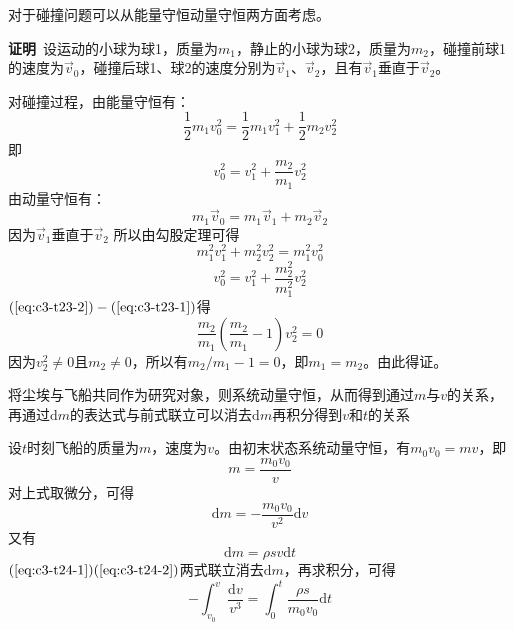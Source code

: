 \documentclass[b5paper,opensource,sourcefont,parskip]{qyxf-book}
\newcommand{\di}[1]{\mathrm{d}#1}
\begin{document}

\analysis 对于碰撞问题可以从能量守恒动量守恒两方面考虑。

\noindent\textbf{证明}\ 设运动的小球为球1，质量为$m_1$，静止的小球为球2，质量为$m_2$，碰撞前球1的速度为$\vec{v}_0$，碰撞后球1、球2的速度分别为$\vec{v}_1$、$\vec{v}_2$，且有$\vec{v}_1$垂直于$\vec{v}_2$。

对碰撞过程，由能量守恒有：
\begin{equation*}
\frac{1}{2}m_1v_0^2=\frac{1}{2}m_1v_1^2+\frac{1}{2}m_2v_2^2
\end{equation*}
即
\begin{equation}\label{eq:c3-t23-1}
v_0^2=v_1^2+\frac{m_2}{m_1}v_2^2
\end{equation}
由动量守恒有：
\begin{equation*}
m_1\vec{v}_0=m_1\vec{v}_1+m_2\vec{v}_2
\end{equation*}
因为$\vec{v}_1$垂直于$\vec{v}_2$
所以由勾股定理可得
\begin{equation*}
m_1^2 v_1^2 + m_2^2 v_2^2 = m_1^2 v_0^2
\end{equation*}
\begin{equation}\label{eq:c3-t23-2}
v_0^2=v_1^2+\frac{m_2^2}{m_1^2}v_2^2
\end{equation}
$(\ref{eq:c3-t23-2})-(\ref{eq:c3-t23-1})$得
\begin{equation*}
\frac{m_2}{m_1}(\frac{m_2}{m_1}-1)v_2^2=0
\end{equation*}
因为$v_2^2 \ne 0$且$m_2 \ne 0$，所以有$m_2/m_1-1=0$，即$m_1=m_2$。由此得证。


\analysis 将尘埃与飞船共同作为研究对象，则系统动量守恒，从而得到通过$m$与$v$的关系，再通过$\di m$的表达式与前式联立可以消去$\di m$再积分得到$v$和$t$的关系

\solve 设$t$时刻飞船的质量为$m$，速度为$v$。由初末状态系统动量守恒，有$m_0 v_0=mv$，即
\begin{equation}
m=\frac{m_0 v_0}{v}
\end{equation}
对上式取微分，可得
\begin{equation}\label{eq:c3-t24-1}
\di m=- \frac{m_0 v_0}{v^2} \di v
\end{equation}
又有
\begin{equation}\label{eq:c3-t24-2}
\di m=\rho sv\di t
\end{equation}
$(\ref{eq:c3-t24-1})(\ref{eq:c3-t24-2})$两式联立消去$\di m$，再求积分，可得
\begin{equation*}
-\int_{v_0}^v \frac{\di v}{v^3}=\int_0^t \frac{\rho s}{m_0 v_0} \di t
\end{equation*}
\end{document}
